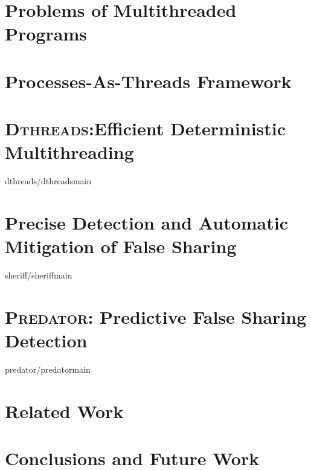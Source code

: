 \documentclass{umthesis}          %
\newcommand{\dthreads}{{\scshape Dthreads}}
\newcommand{\Predator}{\textsc{Predator}}
\newcommand{\DoubleTake}{\textsc{DoubleTake}}
\begin{document}
\tableofcontents                %
\listoffigures                  %


\mainmatter   %



\chapter{Problems of Multithreaded Programs}




\chapter{Processes-As-Threads Framework}


\chapter{\dthreads{}:Efficient Deterministic Multithreading}
 {dthreads/dthreadsmain}

\chapter{Precise Detection and Automatic Mitigation of False Sharing}
 {sheriff/sheriffmain}

\chapter{\Predator{}: Predictive False Sharing Detection}
 {predator/predatormain}

\chapter{Related Work}


\chapter{Conclusions and Future Work}


\backmatter  %




\end{document}
